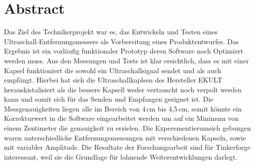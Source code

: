 \section{Abstract}
Das Ziel des Technikerprojekt war es, das Entwickeln und Testen eines Ultraschall-Entfernungsmessers als Vorbereitung eines Produktentwurfes. Das Ergebnis ist ein vorläufig funktionaler Prototyp deren Software noch Optimiert werden muss.
Aus den Messungen und Tests ist klar ersichtlich, dass es mit einer Kapsel funktioniert die sowohl ein Ultraschallsignal sendet und als auch empfängt. Hierbei hat sich die Ultraschallkaplsen des Hersteller EKULT herauskistalisiert als die bessere Kapsell weder vertauscht noch verpolt werden kann und somit sich für das Senden und Empfangen geeignet ist.
Die Messgenauigkeiten liegen alle im Bereich von 4\,cm bis 4,5\,cm, somit könnte ein Korrekturwert in die Software eingearbeitet werden um auf ein Minimum von einem Zentimeter die genauigkeit zu erzielen.
Die Experementierumsich gebungen waren unterschiedliche Entfernungsmessungen mit verschiedenen Kapseln, sowie mit variabler Amplitude. Die Resultate der Forschungsarbeit sind für Tinkerforge interessant, weil sie die Grundlage für lohnende Weiterentwicklungen darlegt.



